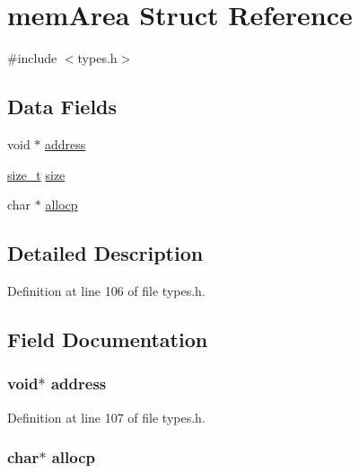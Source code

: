 \hypertarget{structmem_area}{
\section{memArea Struct Reference}
\label{structmem_area}
}


{\ttfamily \#include $<$types.h$>$}

\subsection*{Data Fields}
\begin{DoxyCompactItemize}
\item 
void $\ast$ \hyperlink{structmem_area_ab96816d317aa5196e2ef198d9a8d621b}{address}
\item 
\hyperlink{types_8h_a7b60c5629e55e8ec87a4547dd4abced4}{size\_\-t} \hyperlink{structmem_area_a854352f53b148adc24983a58a1866d66}{size}
\item 
char $\ast$ \hyperlink{structmem_area_aa781caae63dbdaa07fcac17a08e4f048}{allocp}
\end{DoxyCompactItemize}


\subsection{Detailed Description}


Definition at line 106 of file types.h.



\subsection{Field Documentation}
\hypertarget{structmem_area_ab96816d317aa5196e2ef198d9a8d621b}{
\subsubsection[{address}]{\setlength{\rightskip}{0pt plus 5cm}void$\ast$ {\bf address}}}
\label{structmem_area_ab96816d317aa5196e2ef198d9a8d621b}


Definition at line 107 of file types.h.

\hypertarget{structmem_area_aa781caae63dbdaa07fcac17a08e4f048}{
\subsubsection[{allocp}]{\setlength{\rightskip}{0pt plus 5cm}char$\ast$ {\bf allocp}}}
\label{structmem_area_aa781caae63dbdaa07fcac17a08e4f048}


